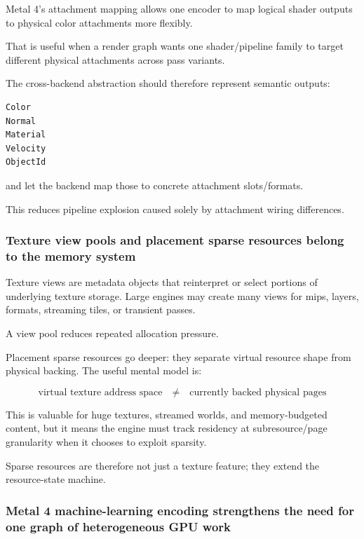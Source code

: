 Metal 4's attachment mapping allows one encoder to map logical shader outputs to physical color attachments more flexibly.

That is useful when a render graph wants one shader/pipeline family to target different physical attachments across pass variants.

The cross-backend abstraction should therefore represent semantic outputs:

\begin{verbatim}
Color
Normal
Material
Velocity
ObjectId
\end{verbatim}

and let the backend map those to concrete attachment slots/formats.

This reduces pipeline explosion caused solely by attachment wiring differences.

\subsubsection{Texture view pools and placement sparse resources belong to the memory system}\label{05-engine-i-ch022-texture-view-pools-and-placement-sparse-resources-belong-to-the-memory-system}

Texture views are metadata objects that reinterpret or select portions of underlying texture storage. Large engines may create many views for mips, layers, formats, streaming tiles, or transient passes.

A view pool reduces repeated allocation pressure.

Placement sparse resources go deeper: they separate virtual resource shape from physical backing. The useful mental model is:

\[
\text{virtual texture address space}
\quad\neq\quad
\text{currently backed physical pages}
\]

This is valuable for huge textures, streamed worlds, and memory-budgeted content, but it means the engine must track residency at subresource/page granularity when it chooses to exploit sparsity.

Sparse resources are therefore not just a texture feature; they extend the resource-state machine.

\subsubsection{Metal 4 machine-learning encoding strengthens the need for one graph of heterogeneous GPU work}\label{05-engine-i-ch022-metal-4-machine-learning-encoding-strengthens-the-need-for-one-graph-of-heterogeneous-gpu-work}

